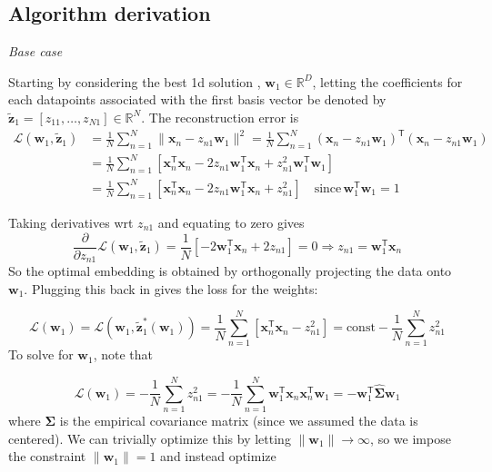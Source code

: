 \documentclass[11pt]{article}
\begin{document}
\subsection{Algorithm derivation}
\textit{Base case}

Starting by considering the best 1d solution , $\mathbf{w}_1 \in \mathbb{R}^D$, letting the coefficients for each datapoints associated with the first basis vector be denoted by $\tilde{\mathbf{z}}_1 = [z_{11}, \dots , z_{N1}] \in \mathbb{R}^N$. The reconstruction error is 
\[
\begin{aligned}
\mathcal{L}(\boldsymbol{w}_1, \tilde{\boldsymbol{z}}_1) &= \frac{1}{N} \sum_{n=1}^N \|\boldsymbol{x}_n - z_{n1}\boldsymbol{w}_1\|^2 = \frac{1}{N} \sum_{n=1}^N (\boldsymbol{x}_n - z_{n1}\boldsymbol{w}_1)^\mathsf{T}(\boldsymbol{x}_n - z_{n1}\boldsymbol{w}_1) \\
&= \frac{1}{N} \sum_{n=1}^N [\boldsymbol{x}_n^\mathsf{T}\boldsymbol{x}_n - 2z_{n1}\boldsymbol{w}_1^\mathsf{T}\boldsymbol{x}_n + z_{n1}^2 \boldsymbol{w}_1^\mathsf{T}\boldsymbol{w}_1] \\ 
&= \frac{1}{N} \sum_{n=1}^N [\boldsymbol{x}_n^\mathsf{T}\boldsymbol{x}_n - 2z_{n1}\boldsymbol{w}_1^\mathsf{T}\boldsymbol{x}_n + z_{n1}^2]
\quad \text{since} \, \boldsymbol{w}_1^\mathsf{T}\boldsymbol{w}_1 = 1
\end{aligned}
\]

Taking derivatives wrt $z_{n1}$ and equating to zero gives
\[
\frac{\partial}{\partial z_{n1}} \mathcal{L}(\boldsymbol{w}_1, \tilde{\boldsymbol{z}}_1) = \frac{1}{N}[-2\boldsymbol{w}_1^\mathsf{T}\boldsymbol{x}_n + 2z_{n1}] = 0 \Rightarrow z_{n1} = \boldsymbol{w}_1^\mathsf{T}\boldsymbol{x}_n
\]
So the optimal embedding is obtained by orthogonally projecting the data onto $\boldsymbol{w}_1$. Plugging this back in gives the loss for the weights:

\[
\mathcal{L}(\boldsymbol{w}_1) = \mathcal{L}(\boldsymbol{w}_1, \tilde{\boldsymbol{z}}_1^*(\boldsymbol{w}_1)) = \frac{1}{N} \sum_{n=1}^N [\boldsymbol{x}_n^\mathsf{T}\boldsymbol{x}_n - z_{n1}^2] = \text{const} - \frac{1}{N} \sum_{n=1}^N z_{n1}^2
\]
To solve for $\boldsymbol{w}_1$, note that

\[
\mathcal{L}(\boldsymbol{w}_1) = -\frac{1}{N} \sum_{n=1}^N z_{n1}^2 = -\frac{1}{N} \sum_{n=1}^N \boldsymbol{w}_1^\mathsf{T}\boldsymbol{x}_n\boldsymbol{x}_n^\mathsf{T}\boldsymbol{w}_1 = -\boldsymbol{w}_1^\mathsf{T}\hat{\boldsymbol{\Sigma}}\boldsymbol{w}_1
\]
where $\boldsymbol{\Sigma}$ is the empirical covariance matrix (since we assumed the data is centered). We can trivially optimize this by letting $\|\boldsymbol{w}_1\| \to \infty$, so we impose the constraint $\|\boldsymbol{w}_1\| = 1$ and instead optimize
\end{document}
